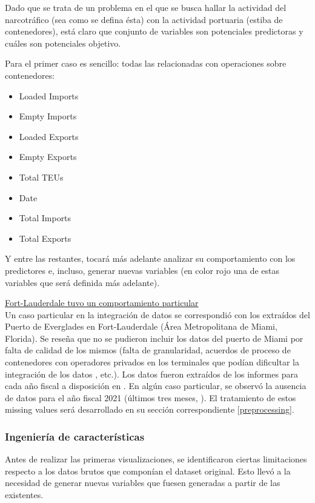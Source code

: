 \documentclass[12pt]{article}
\begin{document}
		Dado que se trata de un problema en el que se busca hallar la actividad del narcotráfico (sea como se defina ésta) con la actividad portuaria (estiba de contenedores), está claro que conjunto de variables son potenciales predictoras y cuáles son potenciales objetivo.
		
		Para el primer caso es sencillo: todas las relacionadas con operaciones sobre contenedores: 
		\begin{itemize}
			\item Loaded Imports
			\item Empty Imports
			\item Loaded Exports
			\item Empty Exports
			\item Total TEUs
			\item Date
			\item Total Imports
			\item Total Exports
		\end{itemize}
	
		Y entre las restantes, tocará más adelante analizar su comportamiento con los predictores e, incluso, generar nuevas variables (en color rojo una de estas variables que será definida más adelante).
		
		\underline{Fort-Lauderdale tuvo un comportamiento particular}\\
		Un caso particular en la integración de datos se correspondió con los extraídos del Puerto de Everglades en Fort-Lauderdale (Área Metropolitana de Miami, Florida). Se reseña que no se pudieron incluir los datos del puerto de Miami por falta de calidad de los mismos (falta de granularidad, acuerdos de proceso de contenedores con operadores privados en los terminales que podían dificultar la integración de los datos \cite{portmiami2025cargo}, etc.). Los datos fueron extraídos de los informes para cada año fiscal a disposición en \cite{porteverglades2025stats}. En algún caso particular, se observó la ausencia de datos para el año fiscal 2021 (últimos tres meses, \cite{porteverglades2021teus}). El tratamiento de estos missing values será desarrollado en su sección correspondiente \ref{preprocessing}.
		
		\subsubsection{\label{feature engineering}Ingeniería de características}
		Antes de realizar las primeras visualizaciones, se identificaron ciertas limitaciones respecto a los datos brutos que componían el dataset original. Esto llevó a la necesidad de generar nuevas variables que fuesen generadas a partir de las existentes.
		
\end{document}
